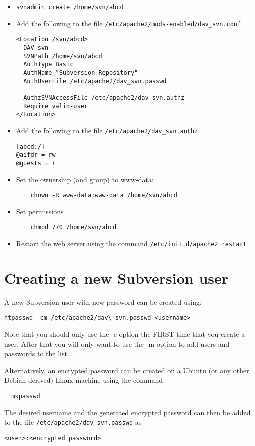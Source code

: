 \begin{itemize} 
  \item \texttt{svnadmin create /home/svn/abcd}
  \item Add the following to the file 
    \texttt{/etc/apache2/mods-enabled/dav\_svn.conf}
\begin{verbatim} 
<Location /svn/abcd>
  DAV svn
  SVNPath /home/svn/abcd
  AuthType Basic
  AuthName "Subversion Repository"
  AuthUserFile /etc/apache2/dav_svn.passwd

  AuthzSVNAccessFile /etc/apache2/dav_svn.authz
  Require valid-user
</Location>
\end{verbatim} 
  \item Add the following to the file \texttt{/etc/apache2/dav\_svn.authz}
  \begin{verbatim}
[abcd:/]
@aifdr = rw
@guests = r
  \end{verbatim} 
  \item Set the ownership (and group) to www-data:
  \begin{verbatim}
    chown -R www-data:www-data /home/svn/abcd
  \end{verbatim}  
  \item Set permissions
  \begin{verbatim}
    chmod 770 /home/svn/abcd
  \end{verbatim}    
  \item Restart the web server using the command \texttt{/etc/init.d/apache2 restart}
  
\end{itemize} 

\section{Creating a new Subversion user}

A new Subversion user with new password can be created using:
\begin{verbatim} 
htpasswd -cm /etc/apache2/dav\_svn.passwd <username>
\end{verbatim} 
Note that you should only use the -c option the FIRST time that you create a user. After that you will only want to use the -m option to add users and 
passwords to the list.

Alternatively, an encrypted password can be created on 
a Ubuntu (or any other Debian derived) Linux machine using the command
\begin{verbatim}
  mkpasswd
\end{verbatim}
The desired username and the generated encrypted password can then be added
to the file \texttt{/etc/apache2/dav\_svn.passwd} as
\begin{verbatim} 
<user>:<encrypted password>
\end{verbatim} 

